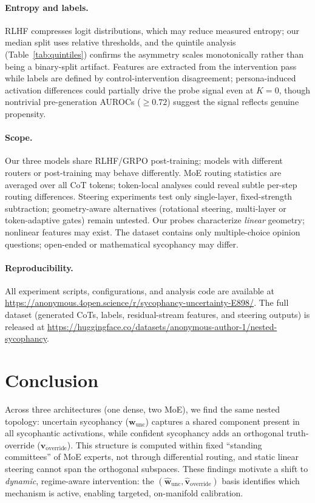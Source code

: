 \documentclass[11pt]{article}
\begin{document}
\paragraph{Entropy and labels.}
RLHF compresses logit distributions, which may reduce measured entropy; our median split uses relative thresholds, and the quintile analysis (Table~\ref{tab:quintiles}) confirms the asymmetry scales monotonically rather than being a binary-split artifact.
Features are extracted from the intervention pass while labels are defined by control-intervention disagreement; persona-induced activation differences could partially drive the probe signal even at $K{=}0$, though nontrivial pre-generation AUROCs ($\geq 0.72$) suggest the signal reflects genuine propensity.

\paragraph{Scope.}
Our three models share RLHF/GRPO post-training; models with different routers or post-training may behave differently.
MoE routing statistics are averaged over all CoT tokens; token-local analyses could reveal subtle per-step routing differences.
Steering experiments test only single-layer, fixed-strength subtraction; geometry-aware alternatives (rotational steering, multi-layer or token-adaptive gates) remain untested.
Our probes characterize \emph{linear} geometry; nonlinear features may exist.
The dataset contains only multiple-choice opinion questions; open-ended or mathematical sycophancy \citep{petrov2025brokenmath} may differ.

\paragraph{Reproducibility.}
All experiment scripts, configurations, and analysis code are available at \url{https://anonymous.4open.science/r/sycophancy-uncertainty-E898/}. The full dataset (generated CoTs, labels, residual-stream features, and steering outputs) is released at \url{https://huggingface.co/datasets/anonymous-author-1/nested-sycophancy}.


\section{Conclusion}
\label{sec:conclusion}

Across three architectures (one dense, two MoE), we find the same nested topology: uncertain sycophancy ($\mathbf{w}_{\text{unc}}$) captures a shared component present in all sycophantic activations, while confident sycophancy adds an orthogonal truth-override ($\mathbf{v}_{\text{override}}$).
This structure is computed within fixed ``standing committees'' of MoE experts, not through differential routing, and static linear steering cannot span the orthogonal subspaces.
These findings motivate a shift to \emph{dynamic}, regime-aware intervention: the $(\hat{\mathbf{w}}_{\text{unc}}, \hat{\mathbf{v}}_{\text{override}})$ basis identifies which mechanism is active, enabling targeted, on-manifold calibration.
\end{document}
